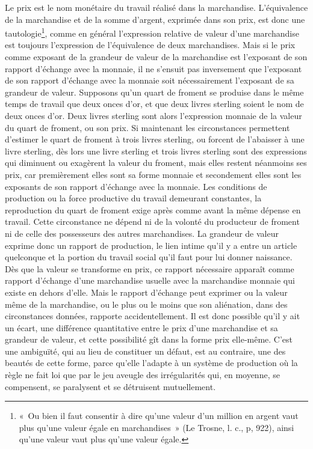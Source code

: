 \documentclass[french,twoside]{book} %
\begin{document}
Le prix est le nom monétaire du travail réalisé dans la marchandise. L’équivalence de la marchandise et de la somme d’argent, exprimée dans son prix, est donc une tautologie\footnote{« Ou bien il faut consentir à dire qu’une valeur d’un million en argent vaut plus qu’une valeur égale en marchandises » (Le Trosne, l. c., p, 922), ainsi qu’une valeur vaut plus qu’une valeur égale.}, comme en général l’expression relative de valeur d’une marchandise est toujours l’expression de l’équivalence de deux marchandises. Mais si le prix comme exposant de la grandeur de valeur de la marchandise est l’exposant de son rapport d’échange avec la monnaie, il ne s’ensuit pas inversement que l’exposant de son rapport d’échange avec la monnaie soit nécessairement l’exposant de sa grandeur de valeur. Supposons qu’un quart de froment se produise dans le même temps de travail que deux onces d’or, et que deux livres sterling soient le nom de deux onces d’or. Deux livres sterling sont alors l’expression monnaie de la valeur du quart de froment, ou son prix. Si maintenant les circonstances permettent d’estimer le quart de froment à trois livres sterling, ou forcent de l’abaisser à une livre sterling, dès lors une livre sterling et trois livres sterling sont des expressions qui diminuent ou exagèrent la valeur du froment, mais elles restent néanmoins ses prix, car premièrement elles sont sa forme monnaie et secondement elles sont les exposants de son rapport d’échange avec la monnaie. Les conditions de production ou la force productive du travail demeurant constantes, la reproduction du quart de froment exige après comme avant la même dépense en travail. Cette circonstance ne dépend ni de la volonté du producteur de froment ni de celle des possesseurs des autres marchandises. La grandeur de valeur exprime donc un rapport de production, le lien intime qu’il y a entre un article quelconque et la portion du travail social qu’il faut pour lui donner naissance. Dès que la valeur se transforme en prix, ce rapport nécessaire apparaît comme rapport d’échange d’une marchandise usuelle avec la marchandise monnaie qui existe en dehors d’elle. Mais le rapport d’échange peut exprimer ou la valeur même de la marchandise, ou le plus ou le moins que son aliénation, dans des circonstances données, rapporte accidentellement. Il est donc possible qu’il y ait un écart, une différence quantitative entre le prix d’une marchandise et sa grandeur de valeur, et cette possibilité gît dans la forme prix elle‑même. C’est une ambiguïté, qui au lieu de constituer un défaut, est au contraire, une des beautés de cette forme, parce qu’elle l’adapte à un système de production où la règle ne fait loi que par le jeu aveugle des irrégularités qui, en moyenne, se compensent, se paralysent et se détruisent mutuellement.\par
\end{document}
